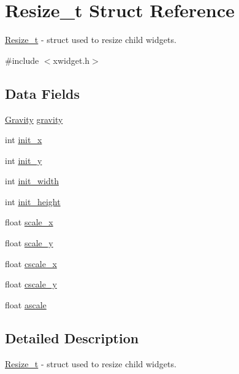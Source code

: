 \hypertarget{structResize__t}{}\section{Resize\+\_\+t Struct Reference}
\label{structResize__t}


\hyperlink{structResize__t}{Resize\+\_\+t} -\/ struct used to resize child widgets.  




{\ttfamily \#include $<$xwidget.\+h$>$}

\subsection*{Data Fields}
\begin{DoxyCompactItemize}
\item 
\hyperlink{xwidget_8h_a5b77df25933eae1169c9efbc78391ade}{Gravity} \hyperlink{structResize__t_a20c3835bb7bf53474f4d54447ffcd191}{gravity}
\item 
int \hyperlink{structResize__t_aff15bb95322452215ca38c4f3c926cd1}{init\+\_\+x}
\item 
int \hyperlink{structResize__t_a2f2c63ce1d407649d6b8daf4d6fbbb98}{init\+\_\+y}
\item 
int \hyperlink{structResize__t_ac2ac6971401bfef5bbfa578068fc65bb}{init\+\_\+width}
\item 
int \hyperlink{structResize__t_ad3562783d29d76a51cb07dbeb7c6042e}{init\+\_\+height}
\item 
float \hyperlink{structResize__t_a66246e7c08afdbe8f576ec4224a4fd3c}{scale\+\_\+x}
\item 
float \hyperlink{structResize__t_ab21caee367ce8e911c1e9b678d3d299e}{scale\+\_\+y}
\item 
float \hyperlink{structResize__t_adde90facb06c76169ff56eeaa39d4c68}{cscale\+\_\+x}
\item 
float \hyperlink{structResize__t_a3a10c30c03b7d10bb546f07f20cafcb1}{cscale\+\_\+y}
\item 
float \hyperlink{structResize__t_a9ab8b994c089d137a4c4d6e9dffdb05b}{ascale}
\end{DoxyCompactItemize}


\subsection{Detailed Description}
\hyperlink{structResize__t}{Resize\+\_\+t} -\/ struct used to resize child widgets. 


